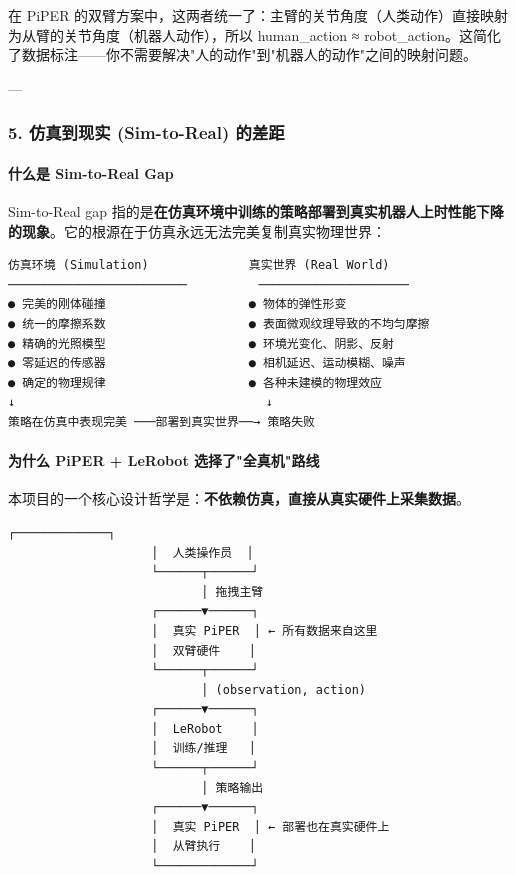 \documentclass[UTF8,a4paper,11pt]{ctexart}
\begin{document}
在 PiPER 的双臂方案中，这两者统一了：主臂的关节角度（人类动作）直接映射为从臂的关节角度（机器人动作），所以 human_action ≈ robot_action。这简化了数据标注——你不需要解决"人的动作"到"机器人的动作"之间的映射问题。

---

\subsubsection{5. 仿真到现实 (Sim-to-Real) 的差距}

\paragraph{什么是 Sim-to-Real Gap}


Sim-to-Real gap 指的是\textbf{在仿真环境中训练的策略部署到真实机器人上时性能下降的现象}。它的根源在于仿真永远无法完美复制真实物理世界：

\begin{lstlisting}[language=text]
仿真环境 (Simulation)              真实世界 (Real World)
─────────────────────────          ─────────────────────
● 完美的刚体碰撞                    ● 物体的弹性形变
● 统一的摩擦系数                    ● 表面微观纹理导致的不均匀摩擦
● 精确的光照模型                    ● 环境光变化、阴影、反射
● 零延迟的传感器                    ● 相机延迟、运动模糊、噪声
● 确定的物理规律                    ● 各种未建模的物理效应
↓                                   ↓
策略在仿真中表现完美 ───部署到真实世界──→ 策略失败
\end{lstlisting}

\paragraph{为什么 PiPER + LeRobot 选择了"全真机"路线}


本项目的一个核心设计哲学是：\textbf{不依赖仿真，直接从真实硬件上采集数据}。

\begin{lstlisting}[language=text]
                    ┌─────────────┐
                    │  人类操作员  │
                    └──────┬──────┘
                           │ 拖拽主臂
                    ┌──────▼──────┐
                    │  真实 PiPER  │ ← 所有数据来自这里
                    │  双臂硬件    │
                    └──────┬──────┘
                           │ (observation, action)
                    ┌──────▼──────┐
                    │  LeRobot    │
                    │  训练/推理   │
                    └──────┬──────┘
                           │ 策略输出
                    ┌──────▼──────┐
                    │  真实 PiPER  │ ← 部署也在真实硬件上
                    │  从臂执行    │
                    └─────────────┘
\end{lstlisting}
\end{document}
